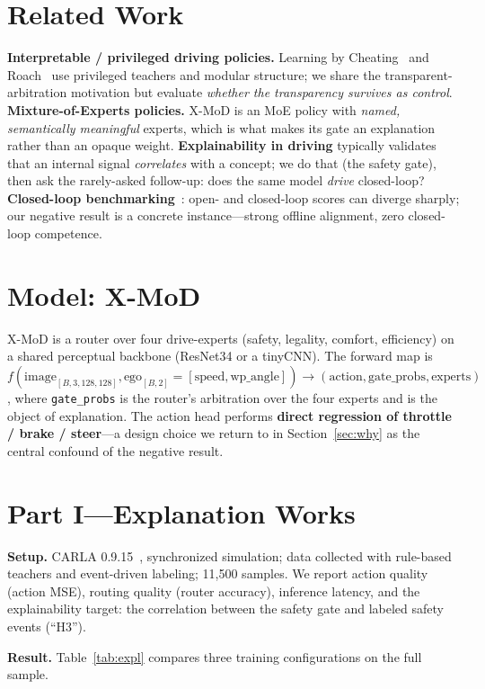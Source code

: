 \documentclass[10pt]{article}
\begin{document}
\section{Related Work}
\textbf{Interpretable / privileged driving policies.} Learning by Cheating~\cite{lbc} and
Roach~\cite{roach} use privileged teachers and modular structure; we share the
transparent-arbitration motivation but evaluate \emph{whether the transparency survives as control}.
\textbf{Mixture-of-Experts policies.} X-MoD is an MoE policy with \emph{named, semantically
meaningful} experts, which is what makes its gate an explanation rather than an opaque weight.
\textbf{Explainability in driving} typically validates that an internal signal \emph{correlates} with
a concept; we do that (the safety gate), then ask the rarely-asked follow-up: does the same model
\emph{drive} closed-loop? \textbf{Closed-loop benchmarking}~\cite{bench2drive,carla,transfuser}: open-
and closed-loop scores can diverge sharply; our negative result is a concrete instance---strong
offline alignment, zero closed-loop competence.

\section{Model: X-MoD}
X-MoD is a router over four drive-experts (safety, legality, comfort, efficiency) on a shared
perceptual backbone (ResNet34 or a tinyCNN). The forward map is
$f(\text{image}_{[B,3,128,128]}, \text{ego}_{[B,2]}=[\text{speed}, \text{wp\_angle}]) \rightarrow
(\text{action}, \text{gate\_probs}, \text{experts})$, where \texttt{gate\_probs} is the router's
arbitration over the four experts and is the object of explanation. The action head performs
\textbf{direct regression of throttle / brake / steer}---a design choice we return to in
Section~\ref{sec:why} as the central confound of the negative result.

\section{Part I---Explanation Works}
\textbf{Setup.} CARLA 0.9.15~\cite{carla}, synchronized simulation; data collected with rule-based
teachers and event-driven labeling; 11{,}500 samples. We report action quality (action MSE), routing
quality (router accuracy), inference latency, and the explainability target: the correlation between
the safety gate and labeled safety events (``H3'').

\textbf{Result.} Table~\ref{tab:expl} compares three training configurations on the full sample.
\end{document}
